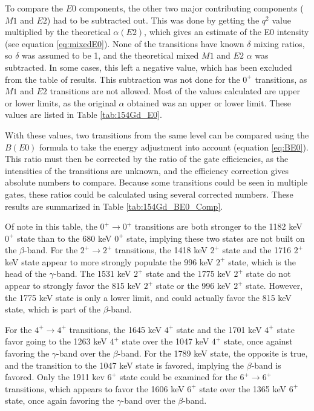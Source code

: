To compare the $E0$ components, the other two major contributing components ($M1$ and $E2$) had to be subtracted out. This was done by getting the $q^2$ value multiplied by the theoretical $\alpha(E2)$, which gives an estimate of the E0 intensity (see equation \ref{eq:mixedE0}). None of the transitions have known $\delta$ mixing ratios, so $\delta$ was assumed to be 1, and the theoretical mixed $M1$ and $E2$ $\alpha$ was subtracted. In some cases, this left a negative value, which has been excluded from the table of results. This subtraction was not done for the $0^+$ transitions, as $M1$ and $E2$ transitions are not allowed. Most of the values calculated are upper or lower limits, as the original $\alpha$ obtained was an upper or lower limit. These values are listed in Table \ref{tab:154Gd_E0}.

With these values, two transitions from the same level can be compared using the $B(E0)$ formula to take the energy adjustment into account (equation \ref{eq:BE0}). This ratio must then be corrected by the ratio of the gate efficiencies, as the intensities of the transitions are unknown, and the efficiency correction gives absolute numbers to compare. Because some transitions could be seen in multiple gates, these ratios could be calculated using several corrected numbers. These results are summarized in Table \ref{tab:154Gd_BE0_Comp}.

\afterpage{\clearpage}

\afterpage{\clearpage}

Of note in this table, the $0^+\rightarrow0^+$ transitions are both stronger to the 1182 keV $0^+$ state than to the 680 keV $0^+$ state, implying these two states are not built on the $\beta$-band. For the $2^+\rightarrow2^+$ transitions, the 1418 keV $2^+$ state and the 1716 $2^+$ keV state appear to more strongly populate the 996 keV $2^+$ state, which is the head of the $\gamma$-band. The 1531 keV $2^+$ state and the 1775 keV $2^+$ state do not appear to strongly favor the 815 keV $2^+$ state or the 996 keV $2^+$ state. However, the 1775 keV state is only a lower limit, and could actually favor the 815 keV state, which is part of the $\beta$-band.

For the $4^+\rightarrow4^+$ transitions, the 1645 keV $4^+$ state and the 1701 keV $4^+$ state favor going to the 1263 keV $4^+$ state over the 1047 keV $4^+$ state, once against favoring the $\gamma$-band over the $\beta$-band. For the 1789 keV state, the opposite is true, and the transition to the 1047 keV state is favored, implying the $\beta$-band is favored. Only the 1911 kev $6^+$ state could be examined for the $6^+\rightarrow6^+$ transitions, which appears to favor the 1606 keV $6^+$ state over the 1365 keV $6^+$ state, once again favoring the $\gamma$-band over the $\beta$-band.